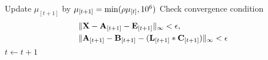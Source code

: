 \begin{algorithm}[t]
{\begin{algorithmic}
\begin{equation}
                \end{equation}
            \State{}Update $\mu_{[t+1]}$ by $\mu_{[t+1]} = \min(\rho {\mu_{[t]}}, 10^6)$
            \State{}Check convergence condition
                \begin{equation}\label{eq:convergence_condition}
                    \begin{aligned}
                        &\lVert {\boldsymbol{\mathbf{X}}} - \boldsymbol{\mathbf{A}}_{[t+1]} - \boldsymbol{\mathbf{E}}_{[t+1]} \rVert_{\infty} < \epsilon, \\
                        &\lVert \boldsymbol{\mathbf{A}}_{[t+1]} - \boldsymbol{\mathbf{B}}_{[t+1]} - (\boldsymbol{\mathbf{L}}_{[t+1]} \ast \boldsymbol{\mathbf{C}}_{[t+1]}) \rVert_{\infty} < \epsilon
                    \end{aligned}
                \end{equation}
            \State{}$t \leftarrow t + 1$
        \EndWhile{}
    \end{algorithmic}
}
\end{algorithm}
